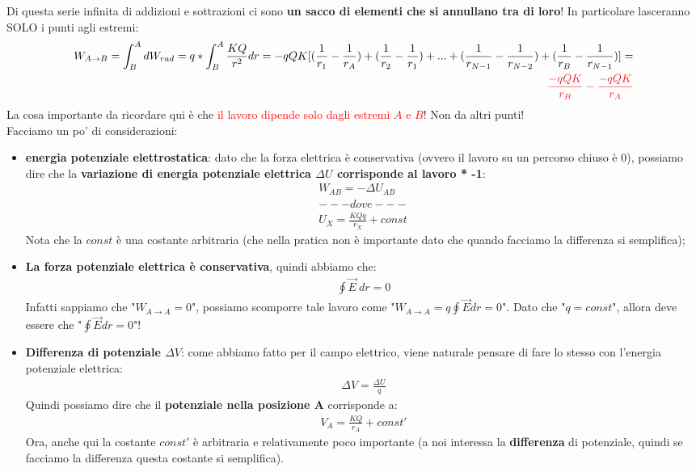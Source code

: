             Di questa serie infinita di addizioni e sottrazioni ci sono \textbf{un sacco di elementi che si annullano tra di loro}! In particolare lasceranno SOLO i punti agli estremi:
            \begin{align*}
                W_{A\rightarrow B} = \int_B^AdW_{rad} =q*\int^A_B\frac{KQ}{r^2}dr = -qQK[(\frac{1}{r_1}-\frac{1}{r_A})+(\frac{1}{r_2}-\frac{1}{r_1})+...+(\frac{1}{r_{N-1}}-\frac{1}{r_{N-2}})+(\frac{1}{r_{B}}-\frac{1}{r_{N-1}})]=\\
                \textcolor{Red}{\frac{-qQK}{r_B}-\frac{-qQK}{r_A}}
            \end{align*}
            La cosa importante da ricordare qui è che \textcolor{Red}{il lavoro dipende solo dagli estremi $A$ e $B$}! Non da altri punti!\\
            Facciamo un po' di considerazioni:
            \begin{itemize}
                \item \textbf{energia potenziale elettrostatica}: dato che la forza elettrica è conservativa (ovvero il lavoro su un percorso chiuso è 0), possiamo dire che la \textbf{variazione di energia potenziale  elettrica $\Delta U$ corrisponde al lavoro * -1}:
                \begin{align*}
                    W_{AB} = -\Delta U_{AB}\\
                    ---dove---\\
                    U_X=\frac{KQq}{r_X}+const
                \end{align*}
                Nota che la $const$ è una costante arbitraria (che nella pratica non è importante dato che quando facciamo la differenza si semplifica);
                \item \textbf{La forza potenziale elettrica è conservativa}, quindi abbiamo che:
                \begin{align*}
                    \oint\vec{E}\ dr = 0
                \end{align*}
                Infatti sappiamo che "$W_{A\rightarrow A} = 0$", possiamo scomporre tale lavoro come "$W_{A\rightarrow A} = q\oint \vec{E}dr = 0$". Dato che "$q=const$", allora deve essere che "$\oint \vec{E}dr = 0$"!
                \item\textbf{Differenza di potenziale $\Delta V$}: come abbiamo fatto per il campo elettrico, viene naturale pensare di fare lo stesso con l'energia potenziale elettrica:
                \begin{align*}
                    \Delta V = \frac{\Delta U}{q}
                \end{align*}
                Quindi possiamo dire che il \textbf{potenziale nella posizione A} corrisponde a:
                \begin{align*}
                    V_A=\frac{KQ}{r_A}+const'
                \end{align*}
                Ora, anche qui la costante $const'$ è arbitraria e relativamente poco importante (a noi interessa la \textbf{differenza} di potenziale, quindi se facciamo la differenza questa costante si semplifica).
            \end{itemize}

